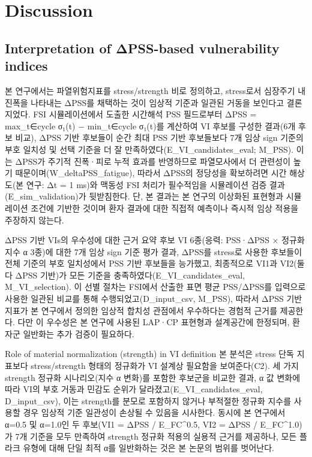 \documentclass[preprint,12pt]{elsarticle}
\begin{document}
\section{Discussion}

\subsection{Interpretation of ΔPSS-based vulnerability indices}
본 연구에서는 파열위험지표를 stress/strength 비로 정의하고, stress로서 심장주기 내 진폭을 나타내는 ΔPSS를 채택하는 것이 임상적 기준과 일관된 거동을 보인다고 결론지었다. FSI 시뮬레이션에서 도출한 시간해석 PSS 필드로부터 ΔPSS = max\_{t∈cycle} σ₁(t) − min\_{t∈cycle} σ₁(t)를 계산하여 VI 후보를 구성한 결과(6개 후보 비교), ΔPSS 기반 후보들이 순간 최대 PSS 기반 후보들보다 7개 임상 sign 기준의 부호 일치성 및 선택 기준을 더 잘 만족하였다(E\_VI\_candidates\_eval; M\_PSS). 이는 ΔPSS가 주기적 진폭·피로 누적 효과를 반영하므로 파열모사에서 더 관련성이 높기 때문이며(W\_deltaPSS\_fatigue), 따라서 ΔPSS의 정당성을 확보하려면 시간 해상도(본 연구: Δt = 1 ms)와 맥동성 FSI 처리가 필수적임을 시뮬레이션 검증 결과(E\_sim\_validation)가 뒷받침한다. 단, 본 결과는 본 연구의 이상화된 표현형과 시뮬레이션 조건에 기반한 것이며 환자 결과에 대한 직접적 예측이나 즉시적 임상 적용을 주장하지 않는다.

ΔPSS 기반 VIs의 우수성에 대한 근거 요약
후보 VI 6종(응력: PSS·ΔPSS × 정규화 지수 α 3종)에 대한 7개 임상 sign 기준 평가 결과, ΔPSS를 stress로 사용한 후보들이 전체 기준의 부호 일치성에서 PSS 기반 후보들을 능가했고, 최종적으로 VI1과 VI2(둘 다 ΔPSS 기반)가 모든 기준을 충족하였다(E\_VI\_candidates\_eval, M\_VI\_selection). 이 선별 절차는 FSI에서 산출한 표면 평균 PSS/ΔPSS를 입력으로 사용한 일관된 비교를 통해 수행되었고(D\_input\_csv, M\_PSS), 따라서 ΔPSS 기반 지표가 본 연구에서 정의한 임상적 합치성 관점에서 우수하다는 경험적 근거를 제공한다. 다만 이 우수성은 본 연구에 사용된 LAP·CP 표현형과 설계공간에 한정되며, 환자군 일반화는 추가 검증이 필요하다.

Role of material normalization (strength) in VI definition
본 분석은 stress 단독 지표보다 stress/strength 형태의 정규화가 VI 설계상 필요함을 보여준다(C2). 세 가지 strength 정규화 시나리오(지수 α 변화)를 포함한 후보군을 비교한 결과, α 값 변화에 따라 VI의 부호 거동과 민감도 순위가 달라졌고(E\_VI\_candidates\_eval, D\_input\_csv), 이는 strength를 분모로 포함하지 않거나 부적절한 정규화 지수를 사용할 경우 임상적 기준 일관성이 손상될 수 있음을 시사한다. 동시에 본 연구에서 α=0.5 및 α=1.0인 두 후보(VI1 = ΔPSS / E\_FC\textasciicircum {0.5}, VI2 = ΔPSS / E\_FC\textasciicircum {1.0})가 7개 기준을 모두 만족하여 strength 정규화 적용의 실용적 근거를 제공하나, 모든 플라크 유형에 대해 단일 최적 α를 일반화하는 것은 본 논문의 범위를 벗어난다.
\end{document}
